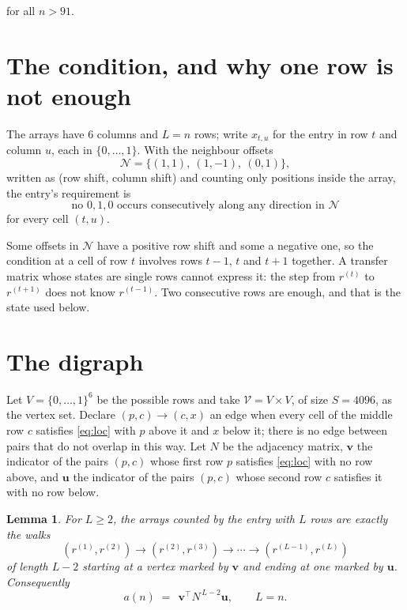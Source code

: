 \documentclass[11pt,a4paper]{article}
\theoremstyle{plain}
\newtheorem{lemma}[theorem]{Lemma}
\theoremstyle{definition}
\begin{document}
for all $n>91$.

\section{The condition, and why one row is not enough}

The arrays have $6$ columns and $L=n$ rows; write $x_{t,u}$ for the entry in
row $t$ and column $u$, each in $\{0,\dots,1\}$. With the neighbour offsets
\[
\mathcal N=\{(1,1),\ (1,-1),\ (0,1)\},
\]
written as (row shift, column shift) and counting only positions inside the array, the
entry's requirement is
\begin{equation}\label{eq:loc}
\text{no }0,1,0\text{ occurs consecutively along any direction in }\mathcal N
\end{equation}
for every cell $(t,u)$.

Some offsets in $\mathcal N$ have a positive row shift and some a negative one, so the
condition at a cell of row $t$ involves rows $t-1$, $t$ and $t+1$ together. A transfer
matrix whose states are single rows cannot express it: the step from $r^{(t)}$ to
$r^{(t+1)}$ does not know $r^{(t-1)}$. Two consecutive rows are enough, and that is
the state used below.

\section{The digraph}

Let $V=\{0,\dots,1\}^{6}$ be the possible rows and take
$\mathcal V=V\times V$, of size $S=4096$, as the vertex set. Declare $(p,c)\to(c,x)$ an edge
when every cell of the middle row $c$ satisfies \eqref{eq:loc} with $p$ above it and $x$
below it; there is no edge between pairs that do not overlap in this way. Let $N$ be the
adjacency matrix, $\mathbf{v}$ the indicator of the pairs $(p,c)$ whose first row $p$
satisfies \eqref{eq:loc} with no row above, and $\mathbf{u}$ the indicator of
the pairs $(p,c)$ whose second row $c$ satisfies it with no row below.

\begin{lemma}\label{lem:walk}
For $L\ge2$, the arrays counted by the entry with $L$ rows are exactly the walks
\[
(r^{(1)},r^{(2)})\to(r^{(2)},r^{(3)})\to\cdots\to(r^{(L-1)},r^{(L)})
\]
of length $L-2$ starting at a vertex marked by $\mathbf{v}$ and ending at one marked by
$\mathbf{u}$. Consequently
\[
a(n)\;=\;\,\mathbf{v}^{\!\top}N^{\,L-2}\mathbf{u},\qquad L=n .
\]
\end{lemma}
\end{document}
